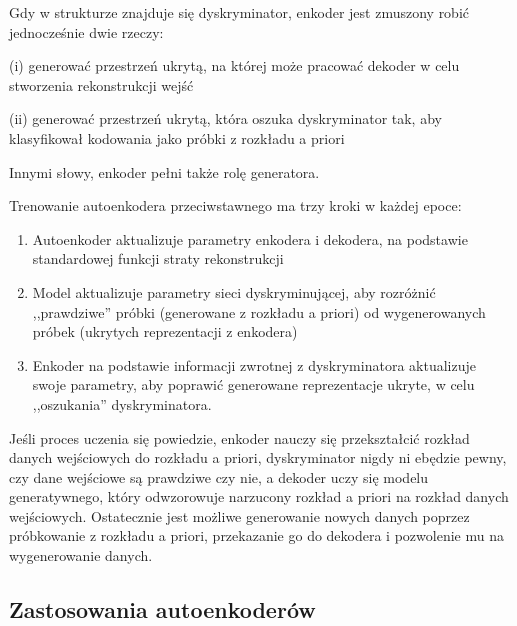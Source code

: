 \documentclass[12pt]{mwbk}
\theoremstyle{plain}
\theoremstyle{definition}
\theoremstyle{remark}
\begin{document}
\newpage

\noindent Gdy w strukturze znajduje się dyskryminator, enkoder jest zmuszony robić jednocześnie dwie rzeczy:

\noindent (i) generować przestrzeń ukrytą, na której może pracować dekoder w celu stworzenia rekonstrukcji wejść

\noindent (ii) generować przestrzeń ukrytą, która oszuka dyskryminator tak, aby klasyfikował kodowania jako próbki z rozkładu a priori

\noindent Innymi słowy, enkoder pełni także rolę generatora.

Trenowanie autoenkodera przeciwstawnego ma trzy kroki w każdej epoce:
 
 \begin{enumerate}

\item Autoenkoder aktualizuje parametry enkodera i dekodera, na podstawie standardowej funkcji straty rekonstrukcji

\item Model aktualizuje parametry sieci dyskryminującej, aby rozróżnić ,,prawdziwe'' próbki (generowane z rozkładu a priori) od wygenerowanych próbek (ukrytych reprezentacji z enkodera)

\item Enkoder na podstawie informacji zwrotnej z dyskryminatora aktualizuje swoje parametry, aby poprawić generowane reprezentacje ukryte, w celu ,,oszukania'' dyskryminatora.

\end{enumerate}

Jeśli proces uczenia się powiedzie, enkoder nauczy się przekształcić rozkład danych wejściowych do rozkładu a priori,  dyskryminator nigdy ni ebędzie pewny, czy dane wejściowe są prawdziwe czy nie, a dekoder uczy się modelu generatywnego, który odwzorowuje narzucony rozkład a priori na rozkład danych wejściowych. Ostatecznie jest możliwe generowanie nowych danych poprzez próbkowanie z rozkładu a priori, przekazanie go do dekodera i pozwolenie mu na wygenerowanie danych.




\subsection{Zastosowania autoenkoderów}
\end{document}
